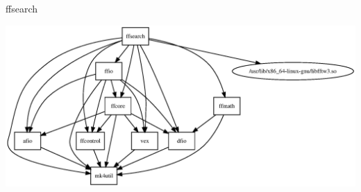 \documentclass[xcolor=svgnames]{beamer}
\begin{document}
\begin{frame}{ffsearch}

\begin{center}
      \includegraphics[width=\textwidth]{ffsearch.png}\\
\end{center}

\end{frame}
\end{document}
